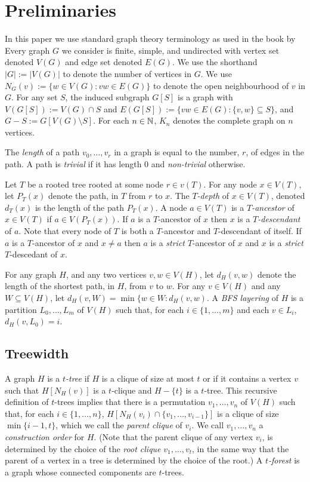 \documentclass[kpfonts]{patmorin}
\theoremstyle{named}
\begin{document}
\section{Preliminaries}

In this paper we use standard graph theory terminology as used in the book by \citet{diestel:graph}
Every graph $G$ we consider is finite, simple, and undirected with vertex set denoted $V(G)$ and edge set denoted $E(G)$.  We use the shorthand $|G|:=|V(G)|$ to denote the number of vertices in $G$.  We use $N_G(v):=\{w\in V(G): vw\in E(G)\}$ to denote the open neighbourhood of $v$ in $G$.  For any set $S$, the induced subgraph  $G[S]$ is a graph with $V(G[S]):=V(G)\cap S$ and $E(G[S]):=\{vw\in E(G): \{v,w\}\subseteq S\}$, and $G-S:=G[V(G)\setminus S]$. For each $n\in\mathbb{N}$, $K_n$ denotes the complete graph on $n$ vertices.

The \emph{length} of a path $v_0,\ldots,v_r$ in a graph is equal to the number, $r$, of edges in the path. A path is \emph{trivial} if it has length 0 and \emph{non-trivial} otherwise.

Let $T$ be a rooted tree rooted at some node $r\in v(T)$.  For any node $x\in V(T)$, let $P_T(x)$ denote the path, in $T$ from $r$ to $x$.  The \emph{$T$-depth} of $x\in V(T)$, denoted $d_T(x)$ is the length of the path $P_T(x)$.  A node $a\in V(T)$ is a \emph{$T$-ancestor} of $x\in V(T)$ if $a\in V(P_T(x))$. If $a$ is a $T$-ancestor of $x$ then $x$ is a \emph{$T$-descendant} of $a$.  Note that every node of $T$ is both a $T$-ancestor and $T$-descendant of itself.  If $a$ is a $T$-ancestor of $x$ and $x\neq a$ then $a$ is a \emph{strict} $T$-ancestor of $x$ and $x$ is a \emph{strict} $T$-descedant of $x$.

For any graph $H$, and any two vertices $v,w\in V(H)$, let $d_H(v,w)$ denote the length of the shortest path, in $H$, from $v$ to $w$. For any $v\in V(H)$ and any $W\subseteq V(H)$, let $d_H(v,W)=\min\{w\in W: d_H(v,w)$. A \emph{BFS layering} of $H$ is a partition $L_0,\ldots,L_m$ of $V(H)$ such that, for each $i\in\{1,\ldots,m\}$ and each $v\in L_i$, $d_H(v,L_0)=i$.


\subsection{Treewidth}

A graph $H$ is a \emph{$t$-tree} if $H$ is a clique of size at most $t$ or if it contains a vertex $v$ such that $H[N_H(v)]$ is a $t$-clique and $H-\{t\}$ is a $t$-tree.  This recursive definition of $t$-trees implies that there is a permutation $v_1,\ldots,v_n$ of $V(H)$ such that, for each $i\in\{1,\ldots,n\}$, $H[N_H(v_i)\cap \{v_1,\ldots,v_{i-1}\}]$ is a clique of size $\min\{i-1,t\}$, which we call the \emph{parent clique} of $v_i$.  We call $v_1,\ldots,v_n$ a \emph{construction order} for $H$.  (Note that the parent clique of any vertex $v_i$, is determined by the choice of the \emph{root clique} $v_1,\ldots,v_t$, in the same way that the parent of a vertex in a tree is determined by the choice of the root.)  A \emph{$t$-forest} is a graph whose connected components are $t$-trees.
\end{document}
